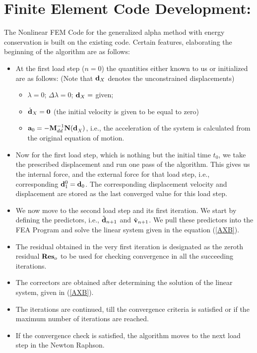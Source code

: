 \section*{Finite Element Code Development:}
The Nonlinear FEM Code for the generalized alpha method with energy conservation is built on the existing code. Certain features, elaborating the beginning of the algorithm are as follows: 
\begin{itemize}
\item At the first load step ($n=0$) the quantities either known to us or initialized are as follows: (Note that ${\bf d}_X$ denotes the unconstrained displacements)
\begin{itemize}
\item $\lambda = 0$; $\Delta\lambda = 0$; ${\bf d}_X =$ given; 
\item $\dot{\bf d}_X = \bf 0$ (the initial velocity is given to be equal to zero)
\item ${\bf a}_0 = - {\bf M}_{dd}^{-1} {\bf N}({\bf d^{{}}_{\it X}})$, i.e., the acceleration of the system is calculated from the original equation of motion. 
\end{itemize}
\item Now for the first load step, which is nothing but the initial time $t_0$, we take the prescribed displacement and run one pass of the algorithm. This gives us the internal force, and the external force for that load step, i.e., corresponding ${\bf d}^{0}_1 = {\bf d}_{0}$. The corresponding displacement velocity and displacement are stored as the last converged value for this load step. 
\item We now move to the second load step and its first iteration. We start by defining the predictors, i.e., $\tilde{\bf d}_{n+1}$ and $\tilde{\bf v}_{n+1}$. We pull these predictors into the FEA Program and solve the linear system given in the equation (\ref{AXB}). 
\item The residual obtained in the very first iteration is designated as the zeroth residual ${\bf Res}_o$ to be used for checking convergence in all the succeeding iterations. 
\item The correctors are obtained after determining the solution of the linear system, given in (\ref{AXB}).  
 \item The iterations are continued, till the convergence criteria is satisfied or if the maximum number of iterations are reached. 
 \item If the convergence check is satisfied, the algorithm moves to the next load step in the Newton Raphson. 
\end{itemize}
